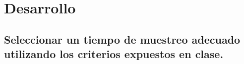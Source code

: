 \section{Desarrollo}

\subsection{Seleccionar un tiempo de muestreo adecuado utilizando los criterios expuestos en clase.}